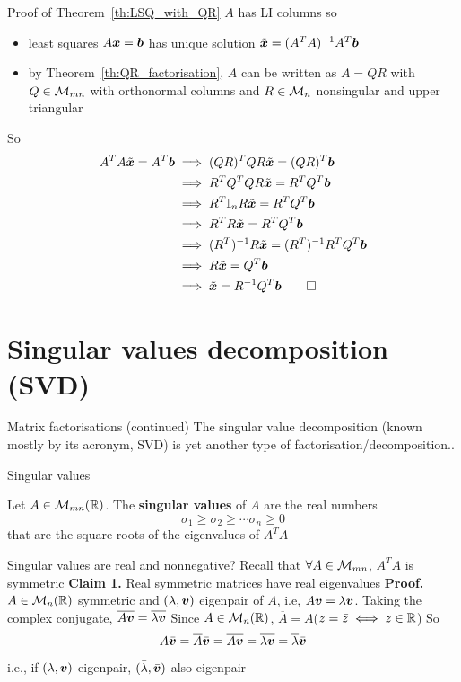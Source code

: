 \documentclass[aspectratio=169]{beamer}\usepackage[]{graphicx}\usepackage[]{xcolor}
\begin{document}
\begin{frame}{Proof of Theorem~\ref{th:LSQ_with_QR}}
$A$ has LI columns so 
\begin{itemize}
\item least squares $A\bm{x}=\bm{b}$ has unique solution $\tilde{\bm{x}}=(A^TA)^{-1}A^T\bm{b}$
\item by Theorem~\ref{th:QR_factorisation}, $A$ can be written as $A=QR$ with $Q\in\mathcal{M}_{mn}$ with orthonormal columns and $R\in\mathcal{M}_n$ nonsingular and upper triangular
\end{itemize}
So
\begin{align*}
A^TA\tilde\bx= A^T\bb &\implies (QR)^TQR\tilde\bx = (QR)^T\bb \\
&\implies R^TQ^TQR\tilde\bx = R^TQ^T\bb \\
&\implies R^T\II_nR\tilde\bx = R^TQ^T\bb \\
&\implies R^TR\tilde\bx = R^TQ^T\bb \\
&\implies (R^T)^{-1}R\tilde\bx = (R^T)^{-1}R^TQ^T\bb \\
&\implies R\tilde\bx = Q^T\bb \\
&\implies \tilde\bx = R^{-1}Q^T\bb\hfill\qed
\end{align*}
\end{frame}



\section{Singular values decomposition (SVD)}

\begin{frame}{Matrix factorisations (continued)}
The singular value decomposition (known mostly by its acronym, SVD) is yet another type of factorisation/decomposition..
\end{frame}


\begin{frame}{Singular values}
\begin{definition}
Let $A\in\mathcal{M}_{mn}(\mathbb{R})$. The \textbf{singular values} of $A$ are the real numbers 
\[
\sigma_1\geq \sigma_2\geq\cdots\sigma_n\geq 0
\]
that are the square roots of the eigenvalues of $A^TA$
\end{definition}
\end{frame}


\begin{frame}{Singular values are real and nonnegative?}
Recall that $\forall A\in\mathcal{M}_{mn}$, $A^TA$ is symmetric
\vfill
\textbf{Claim 1.} Real symmetric matrices have real eigenvalues
\vfill
\textbf{Proof.} $A\in\mathcal{M}_n(\mathbb{R})$ symmetric and $(\lambda,\bm{v})$ eigenpair of $A$, i.e, $A\bm{v}=\lambda\bm{v}$. Taking the complex conjugate, $\overline{A\bm{v}}=\overline{\lambda\bm{v}}$
\vfill
Since $A\in\mathcal{M}_n(\mathbb{R})$, $\overline{A}=A$\qquad ($z=\bar z\iff z\in\mathbb{R}$)
\vfill
So
\[
A\bar{\bm{v}}=\overline{A}\bar{\bm{v}}=\overline{A\bm{v}}=\overline{\lambda\bm{v}}=\overline{\lambda}\bar{\bm{v}}
\]
i.e., if $(\lambda,\bm{v})$ eigenpair, $(\bar\lambda,\bar{\bm{v}})$ also eigenpair
\end{frame}
\end{document}
